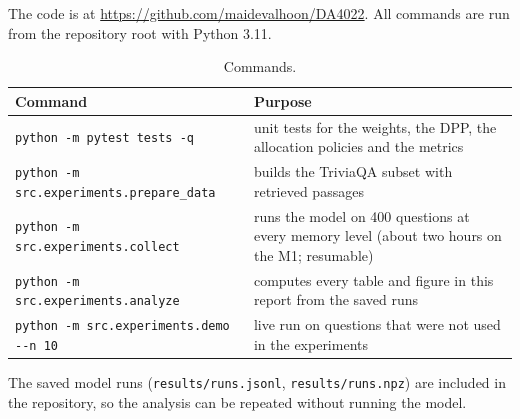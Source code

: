 \documentclass[11pt,a4paper]{article}
\begin{document}
The code is at \url{https://github.com/maidevalhoon/DA4022}. All commands are
run from the repository root with Python 3.11.

\begin{table}[H]
\centering
\small
\begin{tabular}{@{}p{7.4cm}p{7.2cm}@{}}
\toprule
Command & Purpose \\
\midrule
\texttt{python -m pytest tests -q} & unit tests for the weights, the DPP, the allocation policies and the metrics \\
\texttt{python -m src.experiments.prepare\_data} & builds the TriviaQA subset with retrieved passages \\
\texttt{python -m src.experiments.collect} & runs the model on 400 questions at every memory level (about two hours on the M1; resumable) \\
\texttt{python -m src.experiments.analyze} & computes every table and figure in this report from the saved runs \\
\texttt{python -m src.experiments.demo -{}-n 10} & live run on questions that were not used in the experiments \\
\bottomrule
\end{tabular}
\caption{Commands.}
\end{table}

The saved model runs (\texttt{results/runs.jsonl}, \texttt{results/runs.npz})
are included in the repository, so the analysis can be repeated without
running the model.
\end{document}
